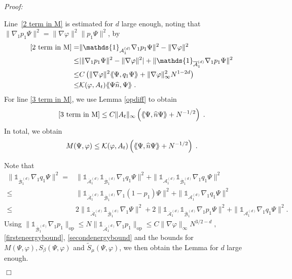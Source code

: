 \documentclass[11pt, english, american]{article}
\newcommand{\laa}{\langle\hspace{-0.08cm}\langle}
\newcommand{\raa}{\rangle\hspace{-0.08cm}\rangle}
\newenvironment{proof}{\emph{Proof:}}{\begin{flushright} $ \Box $ \end{flushright}}
\renewcommand{\phi}{\varphi}
\begin{document}
\begin{proof}
\begin{itemize}
Line~\eqref{2 term in M} is estimated for $d$ large enough, noting that
$ \| \nabla_1 p_1 \Psi  \|^2=
\|\nabla\phi \|^2  \|  p_1 \Psi  \|^2$, by
 \begin{align*}\eqref{2 term in M}=&
 \|\mathds{1}_{\mathcal{A}^{(d)}_{1}}\nabla_1p_1\Psi  \|^2- \|\nabla\phi \|^2 \\
 \leq& |  \| \nabla_1 p_1 \Psi  \|^2- \|\nabla\phi \|^2 |
 +  \|\mathds{1}_{\overline{\mathcal{A}}^{(d)}_{1}}\nabla_1p_1\Psi  \|^2  \\
 \leq& C \left(  \| \nabla \varphi \|^2 \laa \Psi , q_1\Psi \raa +
\| \nabla \phi \|_\infty^2  N^{1 - 2d}  \right) 
 \\
 \leq &
 \mathcal{K}(\phi,A_t) \laa \Psi \widehat{n} , \Psi \raa
 \;.
\end{align*}
For line \eqref{3 term in M}, we use Lemma \ref{opdiff} to obtain
\begin{align*}
\eqref{3 term in M} \leq C\| A_t\|_{\infty}
\left(
\laa \Psi, \widehat{n} \Psi \raa + N^{-1/2}
\right)
\;.
\end{align*}
In total, we obtain
\begin{align*}
M(\Psi, \phi)
\leq
\mathcal{K}(\phi,A_t)
\left(
\laa \Psi, \widehat{n} \Psi \raa + N^{-1/2}
\right)
\;.
\end{align*}
\end{itemize}


Note that
\begin{align*}
 \|\mathds{1}_{\overline{\mathcal{B}}^{(d)}_{1}}
 \nabla_1q_1\Psi \|^2
 =&
  \|
  \mathds{1}_{\overline{\mathcal{A}}^{(d)}_{1}}
  \mathds{1}_{\overline{\mathcal{B}}^{(d)}_{1}}
 \nabla_1q_1\Psi \|^2
 + 
 \|
\mathds{1}_{\mathcal{A}^{(d)}_{1}} 
 \mathds{1}_{\overline{\mathcal{B}}^{(d)}_{1}}
 \nabla_1q_1\Psi \|^2
 \\
 \leq &
   \|
  \mathds{1}_{\overline{\mathcal{A}}^{(d)}_{1}}
  \mathds{1}_{\overline{\mathcal{B}}^{(d)}_{1}}
 \nabla_1
( 1-p_1)
 \Psi \|^2
 + 
 \|
\mathds{1}_{\mathcal{A}^{(d)}_{1}} 
 \nabla_1q_1\Psi \|^2
 \\
 \leq &
2    \|
  \mathds{1}_{\overline{\mathcal{A}}^{(d)}_{1}}
  \mathds{1}_{\overline{\mathcal{B}}^{(d)}_{1}}
 \nabla_1
 \Psi \|^2
+
2
\|
  \mathds{1}_{\overline{\mathcal{A}}^{(d)}_{1}}
  \mathds{1}_{\overline{\mathcal{B}}^{(d)}_{1}}
 \nabla_1 p_1
 \Psi \|^2
 + 
  \|
\mathds{1}_{\mathcal{A}^{(d)}_{1}} 
 \nabla_1q_1\Psi \|^2.
\end{align*}
Using
$
\|\mathds{1}_{\overline{\mathcal{B}}^{(d)}_{1}} \nabla_1 p_1\|_{\text{op}}\leq 
N \|\mathds{1}_{\overline{\mathcal{A}}^{(d)}_{1}}\nabla_1 p_1\|_{\text{op}}\leq 
 C \|\nabla \phi\|_{\infty}N^{3/2-d}\;,
$
\eqref{firsteneergybound}, \eqref{secondenergybound} and the bounds for
 $M( \Psi, \phi),S_\beta( \Psi, \phi)$ and $\tilde{S}_\mu( \Psi, \phi)$,
we then obtain the Lemma for $d$ large enough.







\end{proof}
\end{document}

